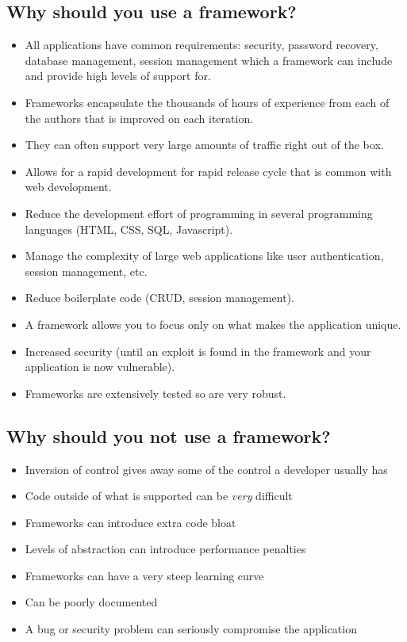 \subsection{Why should you use a framework?}\label{sub:why_frameworks}

\begin{itemize}
    \item All applications have common requirements: security, password recovery, database management, session management which a framework can include and provide high levels of support for.
    \item Frameworks encapsulate the thousands of hours of experience from each of the authors that is improved on each iteration.
    \item They can often support very large amounts of traffic right out of the box.
    \item Allows for a rapid development for rapid release cycle that is common with web development.
    \item Reduce the development effort of programming in several programming languages (HTML, CSS, SQL, Javascript).
    \item Manage the complexity of large web applications like user authentication, session management, etc.
    \item Reduce boilerplate code (CRUD, session management).
    \item A framework allows you to focus only on what makes the application unique.
    \item Increased security (until an exploit is found in the framework and your application is now vulnerable).
    \item Frameworks are extensively tested so are very robust.
\end{itemize}

\subsection{Why should you not use a framework?}\label{sub:why_should_you_not_use_a_framework_}

\begin{itemize}
    \item Inversion of control gives away some of the control a developer usually has
    \item Code outside of what is supported can be \emph{very} difficult
    \item Frameworks can introduce extra code bloat
    \item Levels of abstraction can introduce performance penalties
    \item Frameworks can have a very steep learning curve
    \item Can be poorly documented
    \item A bug or security problem can seriously compromise the application
\end{itemize}


